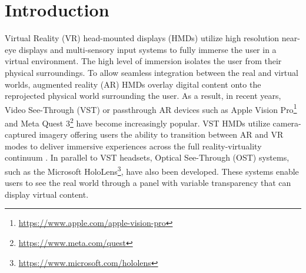\begin{comment}
To-do list
\begin{itemize}
    \item Polish the intro
    \item  Either use whole word or abbreviation (DP and GAP) everywhere to be consistent
    \item  Related work - VST applications and some previous VST works missing, should be more related to the actual work. No mention of GAP (link reprojection part to GAP?).
    \item Trisha and Vrushank - Finalize thematic analysis
    \item Discussion is missing some relation to previous work
    \item Finalize Conclusion
\end{itemize}
\end{comment}

\section{Introduction}

Virtual Reality (VR) head-mounted displays (HMDs) utilize high resolution near-eye displays and multi-sensory input systems to fully immerse the user in a virtual environment. 
The high level of immersion isolates the user from their physical surroundings. To allow seamless integration between the real and virtual worlds, augmented reality (AR) HMDs overlay digital content onto the reprojected physical world surrounding the user. As a result, in recent years, Video See-Through (VST) or passthrough AR devices such as Apple Vision Pro\footnote[1]{\url{https://www.apple.com/apple-vision-pro}} and Meta Quest 3\footnote[2]{\url{https://www.meta.com/quest}} have become increasingly popular. VST HMDs utilize camera-captured imagery offering users the ability to transition between AR and VR modes to deliver immersive experiences across the full reality-virtuality continuum \cite{milgram1995augmented}. In parallel to VST headsets, Optical See-Through (OST) systems, such as the Microsoft HoloLens\footnote[3]{\url{https://www.microsoft.com/hololens}}, have also been developed. These systems enable users to see the real world through a panel with variable transparency that can display virtual content.

